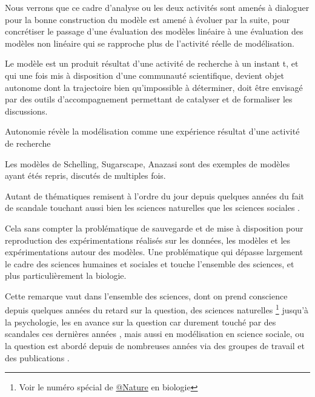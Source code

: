 

Nous verrons que ce cadre d'analyse ou les deux activités sont amenés à dialoguer pour la bonne construction du modèle est amené à évoluer par la suite, pour concrétiser le passage d'une évaluation des modèles linéaire à une évaluation des modèles non linéaire qui se rapproche plus de l'activité réelle de modélisation.

Le modèle est un produit résultat d'une activité de recherche à un instant t, et qui une fois mis à disposition d'une communauté scientifique, devient objet autonome dont la trajectoire bien qu'impossible à déterminer, doit être envisagé par des outils d'accompagnement permettant de catalyser et de formaliser les discussions.

Autonomie révèle la modélisation comme une expérience résultat d'une activité de recherche

Les modèles de Schelling, Sugarscape, Anazasi sont des exemples de modèles ayant étés repris, discutés de multiples fois. 

Autant de thématiques remisent à l'ordre du jour depuis quelques années du fait de scandale touchant aussi bien les sciences naturelles que les sciences sociales \autocite{OpenScience2012}. 

Cela sans compter la problématique de sauvegarde \autocite{Vines2013} \autocite{Turner2013} et de mise à disposition pour reproduction des expérimentations réalisés sur les données, les modèles et les expérimentations autour des modèles. Une problématique qui dépasse largement le cadre des sciences humaines et sociales et touche l'ensemble des sciences, et plus particulièrement la biologie. 

Cette remarque vaut dans l'ensemble des sciences, dont on prend conscience depuis quelques années du retard sur la question, des sciences naturelles \footnote{Voir le numéro spécial de \href{http://www.nature.com/nature/focus/reproducibility/index.html}{@Nature} en biologie} jusqu'à la psychologie, les  en avance sur la question car durement touché par des scandales ces dernières années \autocite{Steen2011}, mais aussi en modélisation en science sociale, ou la question est abordé depuis de nombreuses années via des groupes de travail et des publications \autocite{Hales2003} \autocite{Rouchier2013}.

